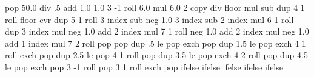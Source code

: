 %
%
%

  {\pgfpoint{0bp}{0bp}}
  {\pgfpoint{100bp}{100bp}}{}{
  pop 50.0 div %
  .5 add %
  1.0 1.0 %
  3 -1 roll %
  6.0 mul %
  6.0 2 copy div floor mul sub %
  dup 4 1 roll %
  floor cvr %
  dup 5 1 roll %
  3 index sub neg %
  1.0 3 index sub %
  2 index mul %
  6 1 roll %
  dup 3 index mul neg 1.0 add %
  2 index mul %
  7 1 roll %
  neg 1.0 add %
  2 index mul neg 1.0 add %
  1 index mul %
  7 2 roll %
  pop pop %
  dup .5 le %
  {
    pop exch pop
  }
  { dup 1.5 le %
    {
      pop exch 4 1 roll exch pop
    }
    { dup 2.5 le %
      {
        pop 4 1 roll pop
      }
      { dup 3.5 le %
        {
          pop exch 4 2 roll pop
        }
        { dup 4.5 le %
          {
            pop exch pop 3 -1 roll
          }
          {
            pop 3 1 roll exch pop
          }
          ifelse
        }
        ifelse %
      }
      ifelse %
    }
    ifelse %
  }
  ifelse %
}

